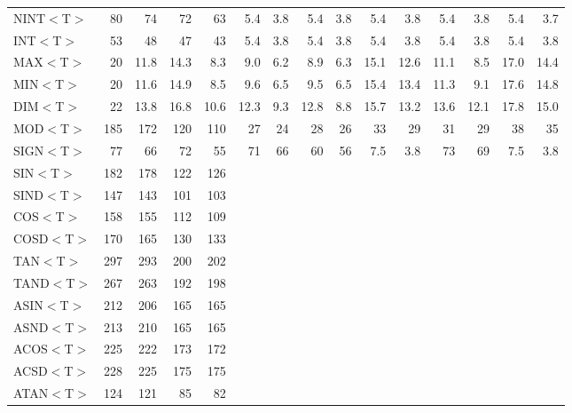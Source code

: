 \begin{table}[h]
\begin{center}
{\begin{tabular}{|l|r|r||r|r||r|r||r|r||r|r||r|r||r|r|}
NINT$<$T$>$ &   80 &   74 &   72 &   63 &  5.4 &  3.8 &  5.4 &  3.8 &  5.4 &  3.8 &  5.4 &  3.8 &  5.4 &  3.7 \\
INT$<$T$>$ &   53 &   48 &   47 &   43 &  5.4 &  3.8 &  5.4 &  3.8 &  5.4 &  3.8 &  5.4 &  3.8 &  5.4 &  3.8 \\
MAX$<$T$>$ &   20 & 11.8 & 14.3 &  8.3 &  9.0 &  6.2 &  8.9 &  6.3 & 15.1 & 12.6 & 11.1 &  8.5 & 17.0 & 14.4 \\
MIN$<$T$>$ &   20 & 11.6 & 14.9 &  8.5 &  9.6 &  6.5 &  9.5 &  6.5 & 15.4 & 13.4 & 11.3 &  9.1 & 17.6 & 14.8 \\
DIM$<$T$>$ &   22 & 13.8 & 16.8 & 10.6 & 12.3 &  9.3 & 12.8 &  8.8 & 15.7 & 13.2 & 13.6 & 12.1 & 17.8 & 15.0 \\
MOD$<$T$>$ &  185 &  172 &  120 &  110 &   27 &   24 &   28 &   26 &   33 &   29 &   31 &   29 &   38 &   35 \\
SIGN$<$T$>$ &   77 &   66 &   72 &   55 &   71 &   66 &   60 &   56 &  7.5 &  3.8 &   73 &   69 &  7.5 &  3.8 \\
SIN$<$T$>$ &  182 &  178 &  122 &  126 &      &      &      &      &      &      &      &      &      &      \\
SIND$<$T$>$ &  147 &  143 &  101 &  103 &      &      &      &      &      &      &      &      &      &      \\
COS$<$T$>$ &  158 &  155 &  112 &  109 &      &      &      &      &      &      &      &      &      &      \\
COSD$<$T$>$ &  170 &  165 &  130 &  133 &      &      &      &      &      &      &      &      &      &      \\
TAN$<$T$>$ &  297 &  293 &  200 &  202 &      &      &      &      &      &      &      &      &      &      \\
TAND$<$T$>$ &  267 &  263 &  192 &  198 &      &      &      &      &      &      &      &      &      &      \\
ASIN$<$T$>$ &  212 &  206 &  165 &  165 &      &      &      &      &      &      &      &      &      &      \\
ASND$<$T$>$ &  213 &  210 &  165 &  165 &      &      &      &      &      &      &      &      &      &      \\
ACOS$<$T$>$ &  225 &  222 &  173 &  172 &      &      &      &      &      &      &      &      &      &      \\
ACSD$<$T$>$ &  228 &  225 &  175 &  175 &      &      &      &      &      &      &      &      &      &      \\
ATAN$<$T$>$ &  124 &  121 &   85 &   82 &      &      &      &      &      &      &      &      &      &      \\

\end{tabular}}
\end{center}
\end{table}
